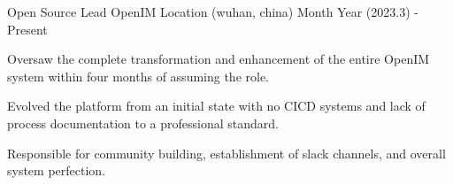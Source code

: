 

\begin{cventries}

  \cventry
    {Open Source Lead} %
    {OpenIM} %
    {Location (wuhan, china)} %
    {Month Year (2023.3) - Present} %
    {
      \begin{cvitems} %
        \item {Oversaw the complete transformation and enhancement of the entire OpenIM system within four months of assuming the role.}
        \item {Evolved the platform from an initial state with no CICD systems and lack of process documentation to a professional standard.}
        \item {Responsible for community building, establishment of slack channels, and overall system perfection.}
      \end{cvitems}
    }


\end{cventries}
